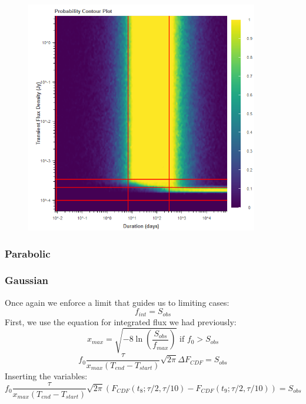 \documentclass{article}
\begin{document}
\begin{figure}[H] 
	\begin{center}
		\includegraphics[width=4in]{output_tophat_ProbContour.png}
		
		\label{tophat}
	\end{center}
\end{figure}
\subsubsection{Parabolic}
\subsubsection{Gaussian}
Once again we enforce a limit that guides us to limiting cases:
\[f_{int} = S_{obs}\]
 First, we use the equation for integrated flux we had previously:
\[x_{max}=\sqrt{-8\ln(\frac{S_{obs}}{f_{max}})}\text{ if }f_0>S_{obs}\]
\[f_0 \frac{\tau}{x_{max}(T_{end}-T_{start})}\sqrt{2\pi}\Delta F_{CDF} =  S_{obs}\]
Inserting the variables:
\[f_0 \frac{\tau}{x_{max}(T_{end} - T_{start})}\sqrt{2\pi}(F_{CDF}(t_8; \tau/2,\tau/10) -F_{CDF}(t_9; \tau/2, \tau/10)) =  S_{obs}\]
\end{document}
